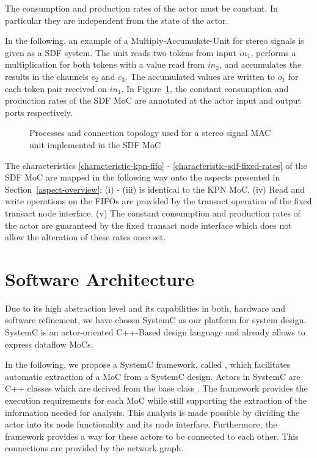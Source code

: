 \begin{characteristic}\label{characteristic-sdf-fixed-rates}
The consumption and production rates of the actor must be constant.
In particular they are independent from the state of the actor.
\end{characteristic}

In the following, an example of a Multiply-Accumulate-Unit for stereo signals is given
as a SDF system. The unit reads two tokens from input $in_1$,
performs a multiplication for both tokens with a value read from $in_2$,
and accumulates the results in the channels $c_2$ and
$c_3$. The accumulated values are written to $o_1$ for each
token pair received on $in_1$.
In Figure~\ref{fig:sdf-mac-unit},
the constant consumption and production rates of the SDF
MoC are annotated at the actor input and output ports
respectively.

\begin{figure}[h]
\centering

\caption{Processes and connection topology used for a stereo signal MAC
  unit implemented in the SDF MoC}
\label{fig:sdf-mac-unit}
\end{figure}

The characteristics \ref{characteristic-kpn-fifo} -
\ref{characteristic-sdf-fixed-rates} of the SDF MoC are mapped in the following way
onto the aspects presented in Section~\ref{aspect-overview}: (i) - (iii) is identical
to the KPN MoC.
(iv) Read and write operations on the FIFOs are provided by the transact
operation of the fixed transact node interface.
(v) The constant consumption and production rates of the actor are
guaranteed by the fixed transact node interface which does
not allow the alteration of these rates once set.

\section{Software Architecture}\label{software-architecture}

Due to its high abstraction level and its capabilities in both,
hardware and software refinement, we have chosen SystemC
\cite{systemc-lrm:2003,glms:2002} as our platform for system design.
SystemC is an actor-oriented C++-Based design language and
already allows to express dataflow MoCs.

In the following, we propose a SystemC framework, called \SysteMoC, which
facilitates automatic extraction of a MoC from a SystemC design.
Actors in SystemC are C++ classes which are derived from the base class .
The \SysteMoC{} framework provides the execution requirements for each MoC while
still supporting the extraction of the information needed for analysis.
This analysis is made possible by dividing the actor into its
node functionality and its node interface.
Furthermore, the \SysteMoC{} framework provides a way for these
actors to be connected to each other. This connections
are provided by the network graph.

